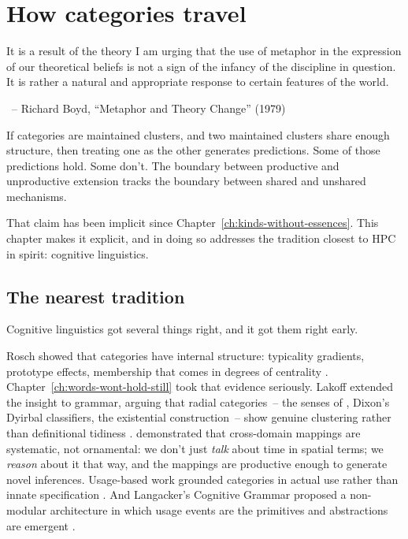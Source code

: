 \chapter{How categories travel}
\label{ch:how-categories-travel}
\epigraph{It is a result of the theory I am urging that the use of metaphor in the expression of our theoretical beliefs is not a sign of the infancy of the discipline in question. It is rather a natural and appropriate response to certain features of the world.}{~-- Richard Boyd, \enquote{Metaphor and Theory Change} (1979)}

If categories are maintained clusters, and two maintained clusters share enough structure, then treating one as the other generates predictions. Some of those predictions hold. Some don't. The boundary between productive and unproductive extension tracks the boundary between shared and unshared mechanisms.

That claim has been implicit since Chapter~\ref{ch:kinds-without-essences}. This chapter makes it explicit, and in doing so addresses the tradition closest to HPC in spirit: cognitive linguistics.

\section{The nearest tradition}
\label{sec:17:nearest-tradition}

Cognitive linguistics got several things right, and it got them right early.

Rosch showed that categories have internal structure: typicality gradients, prototype effects, membership that comes in degrees of centrality \citep{rosch1975}. Chapter~\ref{ch:words-wont-hold-still} took that evidence seriously. Lakoff extended the insight to grammar, arguing that radial categories~-- the senses of , Dixon's Dyirbal classifiers, the existential construction~-- show genuine clustering rather than definitional tidiness \citep{lakoff1987}. \textcite{lakoff1980} demonstrated that cross-domain mappings are systematic, not ornamental: we don't just \emph{talk} about time in spatial terms; we \emph{reason} about it that way, and the mappings are productive enough to generate novel inferences. Usage-based work grounded categories in actual use rather than innate specification \citep{bybee2010,goldberg1995constructions,croft2001}. And Langacker's Cognitive Grammar proposed a non-modular architecture in which usage events are the primitives and abstractions are emergent \citep{langacker1987foundations}.

